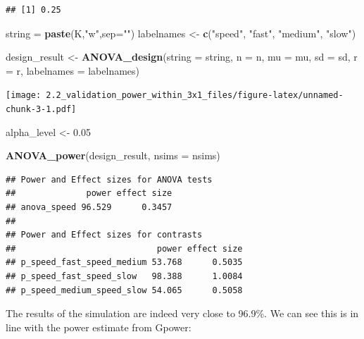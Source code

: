 \documentclass[]{article}
\newenvironment{Shaded}{\begin{snugshade}}{\end{snugshade}}
\newcommand{\KeywordTok}[1]{\textcolor[rgb]{0.13,0.29,0.53}{\textbf{#1}}}
\newcommand{\DataTypeTok}[1]{\textcolor[rgb]{0.13,0.29,0.53}{#1}}
\newcommand{\FloatTok}[1]{\textcolor[rgb]{0.00,0.00,0.81}{#1}}
\newcommand{\StringTok}[1]{\textcolor[rgb]{0.31,0.60,0.02}{#1}}
\newcommand{\NormalTok}[1]{#1}
\begin{document}
\begin{verbatim}
## [1] 0.25
\end{verbatim}

\begin{Shaded}
\begin{Highlighting}[]
\NormalTok{string =}\StringTok{ }\KeywordTok{paste}\NormalTok{(K,}\StringTok{"w"}\NormalTok{,}\DataTypeTok{sep=}\StringTok{""}\NormalTok{)}
\NormalTok{labelnames <-}\StringTok{ }\KeywordTok{c}\NormalTok{(}\StringTok{"speed"}\NormalTok{, }\StringTok{"fast"}\NormalTok{, }\StringTok{"medium"}\NormalTok{, }\StringTok{"slow"}\NormalTok{)}

\NormalTok{design_result <-}\StringTok{ }\KeywordTok{ANOVA_design}\NormalTok{(}\DataTypeTok{string =}\NormalTok{ string,}
                   \DataTypeTok{n =}\NormalTok{ n, }
                   \DataTypeTok{mu =}\NormalTok{ mu, }
                   \DataTypeTok{sd =}\NormalTok{ sd, }
                   \DataTypeTok{r =}\NormalTok{ r, }
                   \DataTypeTok{labelnames =}\NormalTok{ labelnames)}
\end{Highlighting}
\end{Shaded}

\texttt{[image: 2.2\_validation\_power\_within\_3x1\_files/figure-latex/unnamed-chunk-3-1.pdf]}

\begin{Shaded}
\begin{Highlighting}[]
\NormalTok{alpha_level <-}\StringTok{ }\FloatTok{0.05}

\KeywordTok{ANOVA_power}\NormalTok{(design_result, }\DataTypeTok{nsims =}\NormalTok{ nsims)}
\end{Highlighting}
\end{Shaded}

\begin{verbatim}
## Power and Effect sizes for ANOVA tests
##              power effect size
## anova_speed 96.529      0.3457
## 
## Power and Effect sizes for contrasts
##                            power effect size
## p_speed_fast_speed_medium 53.768      0.5035
## p_speed_fast_speed_slow   98.388      1.0084
## p_speed_medium_speed_slow 54.065      0.5058
\end{verbatim}

The results of the simulation are indeed very close to 96.9\%. We can
see this is in line with the power estimate from Gpower:
\end{document}
